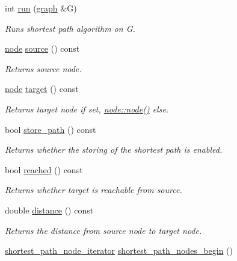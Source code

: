 \begin{DoxyCompactItemize}
int \mbox{\hyperlink{classbid__dijkstra_a1d2f36d3977ef90285442a269a03b919}{run}} (\mbox{\hyperlink{classgraph}{graph}} \&G)
\begin{DoxyCompactList}\small\item\em Runs shortest path algorithm on {\ttfamily G}. \end{DoxyCompactList}\item 
\mbox{\hyperlink{classnode}{node}} \mbox{\hyperlink{classbid__dijkstra_ae8f5268e008b003e38f25c83ed3fd138}{source}} () const
\begin{DoxyCompactList}\small\item\em Returns source node. \end{DoxyCompactList}\item 
\mbox{\hyperlink{classnode}{node}} \mbox{\hyperlink{classbid__dijkstra_a5d32d74a93c1be5581f56ba3a2839ff5}{target}} () const
\begin{DoxyCompactList}\small\item\em Returns target node if set, {\ttfamily \mbox{\hyperlink{classnode_ad603259398d5667e3b97a6322a2bcc20}{node\+::node()}}} else. \end{DoxyCompactList}\item 
bool \mbox{\hyperlink{classbid__dijkstra_ad9716d8f542f07e5696aba778417cc12}{store\+\_\+path}} () const
\begin{DoxyCompactList}\small\item\em Returns whether the storing of the shortest path is enabled. \end{DoxyCompactList}\item 
bool \mbox{\hyperlink{classbid__dijkstra_a97f599b54fe9b030d87474898ff4a64c}{reached}} () const
\begin{DoxyCompactList}\small\item\em Returns whether target is reachable from source. \end{DoxyCompactList}\item 
double \mbox{\hyperlink{classbid__dijkstra_a6150beb75d59f16d0332f42d5ff7e3f3}{distance}} () const
\begin{DoxyCompactList}\small\item\em Returns the distance from source node to target node. \end{DoxyCompactList}\item 
\mbox{\hyperlink{classbid__dijkstra_ada2e642d9f0582d30fe1dd51c4aa1899}{shortest\+\_\+path\+\_\+node\+\_\+iterator}} \mbox{\hyperlink{classbid__dijkstra_a03807bf76c9a75f0e17e79d20d73f48d}{shortest\+\_\+path\+\_\+nodes\+\_\+begin}} ()

\end{DoxyCompactItemize}
